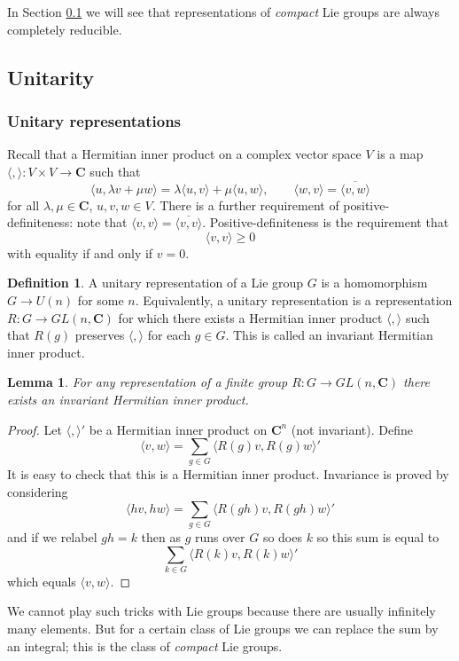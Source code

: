 \documentclass[12pt]{article}
\newcommand{\CC}{\mathbf{C}}
\newtheorem{lma}[thm]{Lemma}
\theoremstyle{definition}
\newtheorem{dfn}[thm]{Definition}
\theoremstyle{check}
\theoremstyle{remark}
\theoremstyle{TheoremNum}
\begin{document}
In Section \ref{sect-unitarity} we will see that representations of {\em compact} Lie groups are always completely reducible.

\subsection{Unitarity}\label{sect-unitarity}

\subsubsection{Unitary representations}

Recall that a Hermitian inner product on a complex vector space $V$ is a map $\langle,\rangle\colon V\times V\to \CC$ such that
\[\langle u,\lambda v+\mu w\rangle=\lambda\langle u,v\rangle+\mu\langle u,w\rangle,\qquad\langle w,v\rangle=\overline{\langle v,w\rangle}\]
for all $\lambda,\mu\in\CC$, $u,v,w\in V$. There is a further requirement of positive-definiteness: note that $\langle v,v\rangle=\overline{\langle v,v\rangle}$. Positive-definiteness is the requirement that
\[\langle v,v\rangle\geq 0\]
with equality if and only if $v=0$.

\begin{dfn}
A unitary representation of a Lie group $G$ is a homomorphism $G\to U(n)$ for some $n$. Equivalently, a unitary representation is a representation $R\colon G\to GL(n,\CC)$ for which there exists a Hermitian inner product $\langle,\rangle$ such that $R(g)$ preserves $\langle,\rangle$ for each $g\in G$. This is called an invariant Hermitian inner product.
\end{dfn}

\begin{lma}
For any representation of a finite group $R\colon G\to GL(n,\CC)$ there exists an invariant Hermitian inner product.
\end{lma}
\begin{proof}
Let $\langle,\rangle'$ be a Hermitian inner product on $\CC^n$ (not invariant). Define
\[\langle v,w\rangle=\sum_{g\in G}\langle R(g)v,R(g)w\rangle'\]
It is easy to check that this is a Hermitian inner product. Invariance is proved by considering
\[\langle hv,hw\rangle=\sum_{g\in G}\langle R(gh)v,R(gh)w\rangle'\]
and if we relabel $gh=k$ then as $g$ runs over $G$ so does $k$ so this sum is equal to
\[\sum_{k\in G}\langle R(k)v,R(k)w\rangle'\]
which equals $\langle v,w\rangle$.
\end{proof}

We cannot play such tricks with Lie groups because there are usually infinitely many elements. But for a certain class of Lie groups we can replace the sum by an integral; this is the class of {\em compact} Lie groups.
\end{document}
